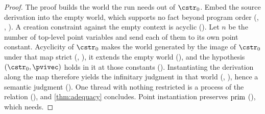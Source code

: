 \begin{proof}
  The proof builds the world the run needs out of $\cstr_0$. Embed the
  source derivation into the empty world, which supports no fact beyond
  program order (, ,
  ). A creation constraint against the empty context
  is acyclic (). Let $n$ be the
  number of top-level point variables and send each of them to its own
  point constant. Acyclicity of $\cstr_0$ makes the world generated by
  the image of $\cstr_0$ under that map strict (,
  ), it extends the empty world (), and
  the hypothesis $(\cstr_0, \pvivec)$ holds in it at those constants
  (). Instantiating the derivation along the map
  therefore yields the infinitary judgment in that world
  (, ), hence a semantic judgment
  (). One thread with nothing restricted is
  a process of the relation (), and
  \cref{thm:adequacy} concludes. Point instantiation preserves
  $\operatorname{prim}$ (), which  needs.
\end{proof}

